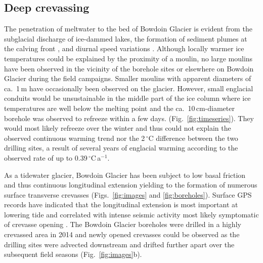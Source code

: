 \documentclass[utf8]{article}
\begin{document}
\subsection{Deep crevassing}

    The penetration of meltwater to the bed of Bowdoin Glacier is evident from
    the subglacial discharge of ice-dammed lakes, the formation of sediment
    plumes at the calving front \citep{Jouvet.etal.2018, Kanna.etal.2018}, and
    diurnal speed variations \citep{Sugiyama.etal.2014, Podolskiy.etal.2016}.
    Although locally warmer ice temperatures could be explained by the
    proximity of a moulin, no large moulins have been observed in the vicinity
    of the borehole sites or elsewhere on Bowdoin Glacier during the field
    campaigns. Smaller moulins with apparent diameters of ca.~1\,m have
    occasionally been observed on the glacier. However, small englacial
    conduits would be unsustainable in the middle part of the ice column where
    ice temperatures are well below the melting point and the
    ca.~10\,cm-diameter borehole was observed to refreeze within a few days.
    (Fig.~\ref{fig:timeseries}). They would
    most likely refreeze over the winter and thus could not explain the
    observed continuous warming trend nor the 2\,$^\circ$C difference between
    the two drilling sites, a result of several years of englacial warming
    according to the observed rate of up to 0.39\,$^\circ$C\,a$^{-1}$.

    As a tidewater glacier, Bowdoin Glacier has been subject to low basal
    friction \citep{Seddik.etal.2019} and
    thus continuous longitudinal extension yielding to the formation of
    numerous surface transverse crevasses (Figs.~\ref{fig:images} and
    \ref{fig:boreholes}). Surface GPS records have indicated that the
    longitudinal extension is most important at lowering tide and correlated
    with intense seismic activity most likely symptomatic of crevasse opening
    \citep{Podolskiy.etal.2016, Podolskiy.etal.2017}.
    The Bowdoin Glacier boreholes were drilled in a highly crevassed area in
    2014 and newly opened crevasses could be observed as the drilling sites
    were
    advected downstream and drifted further apart over the subsequent field
    seasons (Fig.~\ref{fig:images}b).
\end{document}
